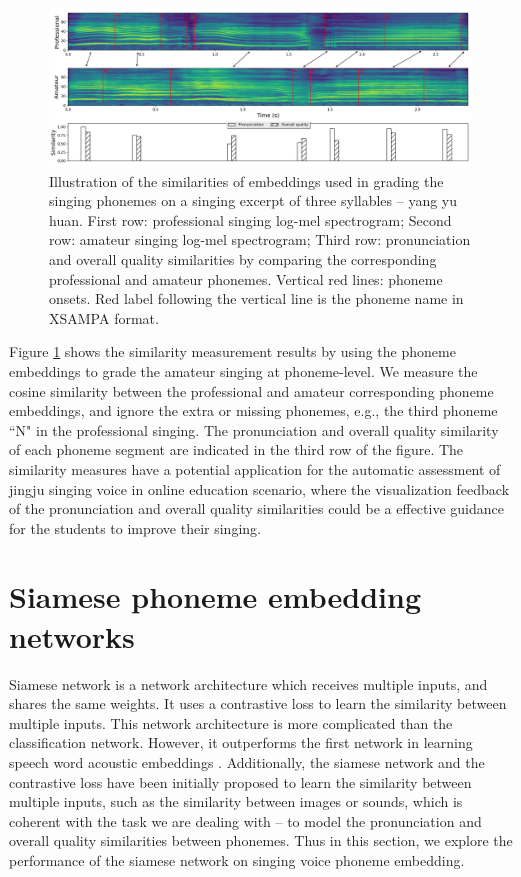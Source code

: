 \begin{figure}[ht!]
    \centering
    \includegraphics[width=\textwidth]{figs/ch7/yang_yu_huan.png}
    \caption{Illustration of the similarities of embeddings used in grading the singing phonemes on a singing excerpt of three syllables -- yang yu huan. First row: professional singing log-mel spectrogram; Second row: amateur singing log-mel spectrogram; Third row: pronunciation and overall quality similarities by comparing the corresponding professional and amateur phonemes. Vertical red lines: phoneme onsets. Red label following the vertical line is the phoneme name in XSAMPA format.}
    \label{fig:ch7:illustration_embedding}
\end{figure}

Figure \ref{fig:ch7:illustration_embedding} shows the similarity measurement results by using the phoneme embeddings to grade the amateur singing at phoneme-level. We measure the cosine similarity between the professional and amateur corresponding phoneme embeddings, and ignore the extra or missing phonemes, e.g., the third phoneme ``N" in the professional singing. The pronunciation and overall quality similarity of each phoneme segment are indicated in the third row of the figure. The similarity measures have a potential application for the automatic assessment of jingju singing voice in online education scenario, where the visualization feedback of the pronunciation and overall quality similarities could be a effective guidance for the students to improve their singing.

\section{Siamese phoneme embedding networks}

Siamese network is a network architecture which receives multiple inputs, and shares the same weights. It uses a contrastive loss to learn the similarity between multiple inputs. This network architecture is more complicated than the classification network. However, it outperforms the first network in learning speech word acoustic embeddings \cite{Settle2016a}. Additionally, the siamese network and the contrastive loss have been initially proposed to learn the similarity between multiple inputs, such as the similarity between images or sounds, which is coherent with the task we are dealing with -- to model the pronunciation and overall quality similarities between phonemes. Thus in this section, we explore the performance of the siamese network on singing voice phoneme embedding. 

